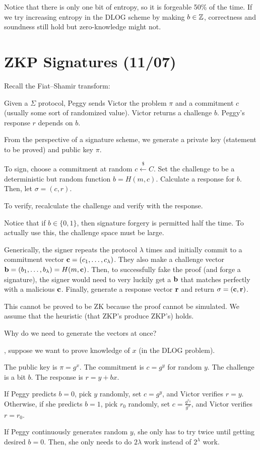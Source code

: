 \documentclass[notes]{agony}
\newcommand{\xgets}{\xleftarrow}
\newcommand{\ndgets}{\xgets{\mathdollar}}
\begin{document}
Notice that there is only one bit of entropy, so it is forgeable 50\% of the time.
If we try increasing entropy in the DLOG scheme by making $b \in \mathbb{Z}$,
correctness and soundness still hold but zero-knowledge might not.

\section{ZKP Signatures (11/07)}

Recall the Fiat--Shamir transform:

Given a $\Sigma$ protocol,
Peggy sends Victor the problem $\pi$
and a commitment $c$ (usually some sort of randomized value).
Victor returns a challenge $b$.
Peggy's response $r$ depends on $b$.

From the perspective of a signature scheme,
we generate a private key (statement to be proved)
and public key $\pi$.

To sign, choose a commitment at random $c \ndgets C$.
Set the challenge to be a deterministic but random function $b = H(m, c)$.
Calculate a response for $b$.
Then, let $\sigma = (c, r)$.

To verify, recalculate the challenge and verify with the response.

Notice that if $b \in \{0,1\}$, then signature forgery is permitted half the time.
To actually use this, the challenge space must be large.

Generically, the signer repeats the protocol $\lambda$ times
and initially commit to a commitment vector $\vb c = (c_1,\dotsc,c_\lambda)$.
They also make a challenge vector $\vb b = (b_1,\dotsc,b_\lambda) = H(m,\vb c)$.
Then, to successfully fake the proof (and forge a signature),
the signer would need to very luckily get a $\vb b$
that matches perfectly with a malicious $\vb c$.
Finally, generate a response vector $\vb r$ and return $\sigma = (\vb c, \vb r)$.

This cannot be proved to be ZK because the proof cannot be simulated.
We assume that the heuristic (that ZKP's produce ZKP's) holds.

\begin{example}
  Why do we need to generate the vectors at once?

  \WLOG, suppose we want to prove knowledge of $x$ (in the DLOG problem).

  The public key is $\pi = g^x$.
  The commitment is $c = g^y$ for random $y$.
  The challenge is a bit $b$.
  The response is $r = y + bx$.

  If Peggy predicts $b = 0$,
  pick $y$ randomly, set $c = g^y$,
  and Victor verifies $r = y$.
  Otherwise, if she predicts $b = 1$,
  pick $r_0$ randomly, set $c = \frac{g^{r_0}}{g^x}$,
  and Victor verifies $r = r_0$.

  If Peggy continuously generates random $y$,
  she only has to try twice until getting desired $b=0$.
  Then, she only needs to do $2\lambda$ work instead of $2^\lambda$ work.
\end{example}
\end{document}
